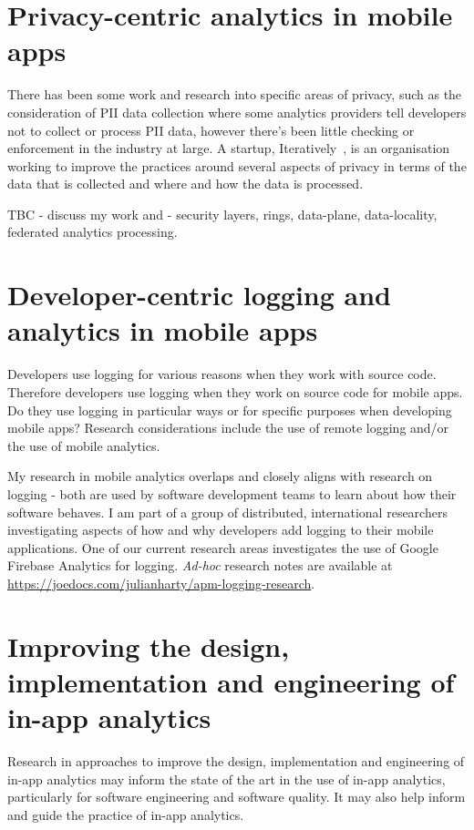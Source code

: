 \section{Privacy-centric analytics in mobile apps}
There has been some work and research into specific areas of privacy, such as the consideration of PII data collection where some analytics providers tell developers not to collect or process PII data, however there's been little checking or enforcement in the industry at large. A startup, Iteratively~\cite{iteratively_homepage}, is an organisation working to improve the practices around several aspects of privacy in terms of the data that is collected and where and how the data is processed.

TBC - discuss my work and - security layers, rings, data-plane, data-locality, federated analytics processing.

\section{Developer-centric logging and analytics in mobile apps}
Developers use logging for various reasons when they work with source code. Therefore developers use logging when they work on source code for mobile apps. Do they use logging in particular ways or for specific purposes when developing mobile apps? Research considerations include the use of remote logging and/or the use of mobile analytics.

My research in mobile analytics overlaps and closely aligns with research on logging - both are used by software development teams to learn about how their software behaves. I am part of a group of distributed, international researchers investigating aspects of how and why developers add logging to their mobile applications. One of our current research areas investigates the use of Google Firebase Analytics for logging. \emph{Ad-hoc} research notes are available at \url{https://joedocs.com/julianharty/apm-logging-research}.


\section{Improving the design, implementation and engineering of in-app analytics}
Research in approaches to improve the design, implementation and engineering of in-app analytics may inform the state of the art in the use of in-app analytics, particularly for software engineering and software quality. It may also help inform and guide the practice of in-app analytics. 

